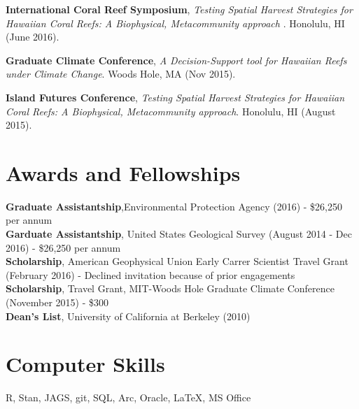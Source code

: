 \documentclass[10pt, letterpaper]{article}
\begin{document}
\noindent \textbf{International Coral Reef Symposium}, \textit{Testing Spatial Harvest Strategies for Hawaiian Coral Reefs: A Biophysical, Metacommunity approach }. Honolulu, HI (June 2016).

\noindent \textbf{Graduate Climate Conference}, \textit{A Decision-Support tool for Hawaiian Reefs under Climate Change}. Woods Hole, MA (Nov 2015).

\noindent \textbf{Island Futures Conference}, \textit{Testing Spatial Harvest Strategies for Hawaiian Coral Reefs: A Biophysical, Metacommunity approach}. Honolulu, HI (August 2015).

\section*{Awards and Fellowships}
\textbf{Graduate Assistantship},Environmental Protection Agency (2016) - \$26,250 per annum \\
\textbf{Garduate Assistantship}, United States Geological Survey (August 2014 - Dec 2016) - \$26,250 per annum \\
\textbf{Scholarship}, American Geophysical Union Early Carrer Scientist Travel Grant (February 2016) - Declined invitation because of prior engagements \\
\textbf{Scholarship}, Travel Grant, MIT-Woods Hole Graduate Climate Conference (November 2015) - \$300 \\
\textbf{Dean's List}, University of California at Berkeley (2010) \\

\section*{Computer Skills}
 R, Stan, JAGS, git, SQL, Arc, Oracle, \LaTeX, MS Office
\end{document}

